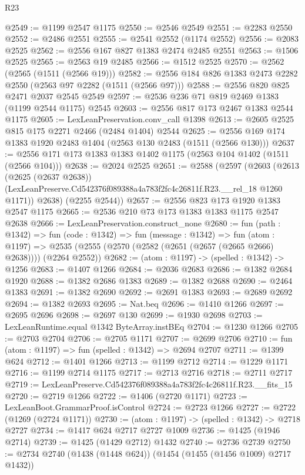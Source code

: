 \begin{lexlean}{R23}
\begin{coremodule}
@2549 := @1199 @2547 @1175
@2550 := @2546 @2549
@2551 := @2283 @2550
@2552 := @2486 @2551
@2555 := @2541 @2552 (@1174 @2552)
@2556 := @2083 @2525
@2562 := @2556 @167 @827 @1383 @2474 @2485 @2551
@2563 := @1506 @2525
@2565 := @2563 @19 @2485
@2566 := @1512 @2525
@2570 := @2562 (@2565 (@1511 (@2566 @19)))
@2582 := @2556 @184 @826 @1383 @2473 @2282 @2550 (@2563 @97 @2282 (@1511 (@2566 @97)))
@2588 := @2556 @820 @825 @2471 @2037 @2545 @2549
@2597 := @2536 @236 @71 @819 @2469 @1383 (@1199 @2544 @1175) @2545
@2603 := @2556 @817 @173 @2467 @1383 @2544 @1175
@2605 := LexLeanPreservation.conv_call @1398
@2613 := @2605 @2525 @815 @175 @2271 @2466 (@2484 @1404) @2544
@2625 := @2556 @169 @174 @1383 @1920 @2483 @1404 (@2563 @130 @2483 (@1511 (@2566 @130)))
@2637 := @2556 @171 @173 @1383 @1383 @1402 @1175 (@2563 @104 @1402 (@1511 (@2566 @104)))
@2638 := @2024 @2525
@2651 := @2588
    (@2597
      (@2603
        (@2613
          (@2625 (@2637 @2638))
          (LexLeanPreserve.Cd542376f089388a4a783f2fc4c26811f.R23.__rel_18 @1260 @1171))
        @2638)
      (@2255 @2544))
@2657 := @2556 @823 @173 @1920 @1383 @2547 @1175
@2665 := @2536 @210 @73 @173 @1383 @1383 @1175 @2547 @2638
@2666 := LexLeanPreservation.construct_none
@2680 := fun (path : @1342) =>
  fun (code : @1342) =>
  fun (message : @1342) =>
  fun (atom : @1197) =>
  @2535 (@2555 (@2570 (@2582 (@2651 (@2657 (@2665 @2666) @2638)))) (@2264 @2552))
@2682 := (atom : @1197) -> (spelled : @1342) -> @1256
@2683 := @1407 @1266
@2684 := @2036 @2683
@2686 := @1382 @2684 @1920
@2688 := @1382 @2686 @1383
@2689 := @1382 @2688
@2690 := @2464 @1383
@2691 := @1382 @2690
@2692 := @2691 @1383
@2693 := @2689 @2692
@2694 := @1382 @2693
@2695 := Nat.beq
@2696 := @1410 @1266
@2697 := @2695 @2696
@2698 := @2697 @130
@2699 := @1930 @2698
@2703 := LexLeanRuntime.equal @1342 ByteArray.instBEq
@2704 := @1230 @1266
@2705 := @2703 @2704
@2706 := @2705 @1171
@2707 := @2699 @2706
@2710 := fun (atom : @1197) => fun (spelled : @1342) => @2694 @2707
@2711 := @1399 @624
@2712 := @1401 @1266
@2713 := @1199 @2712
@2714 := @1229 @1171
@2716 := @1199 @2714 @1175
@2717 := @2713 @2716
@2718 := @2711 @2717
@2719 := LexLeanPreserve.Cd542376f089388a4a783f2fc4c26811f.R23.__fits_15
@2720 := @2719 @1266
@2722 := @1406 (@2720 @1171)
@2723 := LexLeanBoot.GrammarProof.isControl
@2724 := @2723 @1266
@2727 := @2722 (@1269 (@2724 @1171))
@2730 := (atom : @1197) -> (spelled : @1342) -> @2718 @2727
@2734 := @1417 @624 @2717 @2727 @1009
@2736 := @1425 (@1946 @2714)
@2739 := @1425 (@1429 @2712) @1432
@2740 := @2736 @2739
@2750 := @2734 @2740 (@1438 (@1448 @624)) (@1454 (@1455 (@1456 @1009) @2717 @1432))

\end{coremodule}
\end{lexlean}
